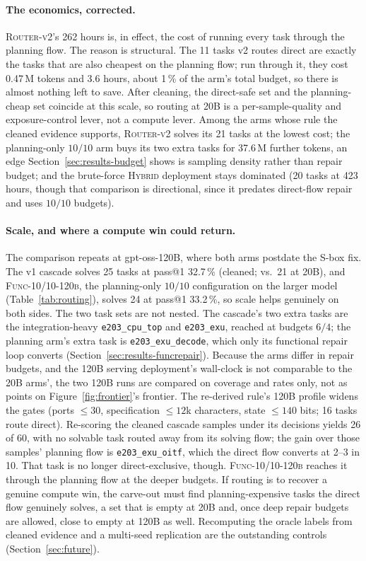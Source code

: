 \paragraph{The economics, corrected.}
\textsc{Router-v2}'s 262 hours is, in effect, the cost of running every
task through the planning flow. The reason is structural. The 11 tasks v2
routes direct are exactly the tasks that are also cheapest on the
planning flow; run through it, they cost 0.47\,M tokens and 3.6 hours, about
1\,\% of the arm's total budget, so there is almost nothing left to
save. After cleaning, the direct-safe set and the planning-cheap set
coincide at this scale, so routing at 20B is a per-sample-quality and
exposure-control lever, not a compute lever. Among the arms whose rule
the cleaned evidence supports, \textsc{Router-v2} solves its 21 tasks
at the lowest cost; the planning-only $10/10$ arm buys its two extra tasks for
37.6\,M further tokens, an edge Section~\ref{sec:results-budget} shows
is sampling density rather than repair budget; and the brute-force
\textsc{Hybrid} deployment stays dominated (20 tasks at 423 hours,
though that comparison is directional, since it predates direct-flow
repair and uses $10/10$ budgets).

\paragraph{Scale, and where a compute win could return.}
The comparison repeats at gpt-oss-120B, where both arms postdate the
S-box fix. The v1
cascade solves 25 tasks at pass@1 32.7\,\% (cleaned; vs.\ 21 at 20B),
and \textsc{Func-10/10-120b}, the planning-only $10/10$ configuration
on the larger model (Table~\ref{tab:routing}), solves 24 at pass@1
33.2\,\%, so scale helps
genuinely on both sides. The two task sets are not nested. The
cascade's two extra tasks are the integration-heavy
\texttt{e203\_cpu\_top} and \texttt{e203\_exu}, reached at budgets
$6/4$; the planning arm's extra task is \texttt{e203\_exu\_decode},
which only its functional repair loop converts
(Section~\ref{sec:results-funcrepair}). Because the arms differ in
repair budgets, and the 120B serving deployment's wall-clock is not
comparable to the 20B arms', the two 120B runs are compared on
coverage and rates only, not as points on
Figure~\ref{fig:frontier}'s frontier.
The re-derived rule's 120B profile widens the gates (ports $\leq 30$,
specification $\leq 12$k characters, state $\leq 140$ bits; 16 tasks
route direct). Re-scoring the cleaned cascade samples under its
decisions yields 26 of 60, with no solvable task routed away from its
solving flow; the gain over those samples' planning flow is
\texttt{e203\_exu\_oitf}, which the direct flow converts at 2--3 in
10. That task is no longer direct-exclusive, though.
\textsc{Func-10/10-120b} reaches it through the planning flow at the
deeper budgets. If routing is to recover a genuine compute win, the
carve-out must find planning-expensive tasks the direct flow
genuinely solves, a set that is empty at 20B and, once deep repair
budgets are allowed, close to empty at 120B as well. Recomputing the
oracle labels from cleaned evidence and a multi-seed replication are
the outstanding controls (Section~\ref{sec:future}).


